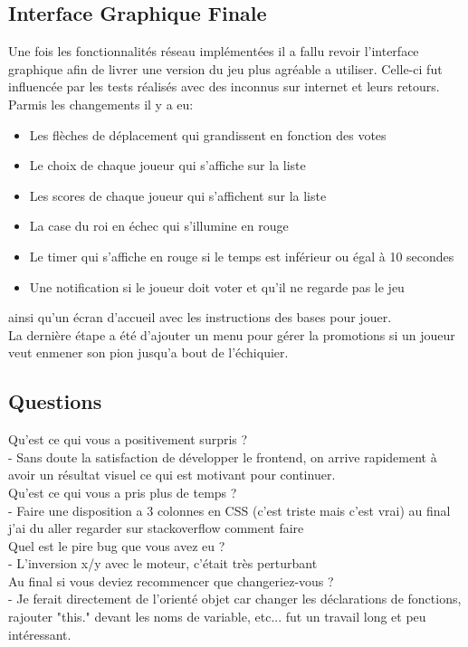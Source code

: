\documentclass{article}
\begin{document}
\subsection{Interface Graphique Finale}
Une fois les fonctionnalités réseau implémentées il a fallu revoir l'interface graphique afin de livrer une version du jeu plus agréable a utiliser. Celle-ci fut influencée par les tests réalisés avec des inconnus sur internet et leurs retours.\\
Parmis les changements il y a eu:
\begin{itemize}
 \item Les flèches de déplacement qui grandissent en fonction des votes
 \item Le choix de chaque joueur qui s'affiche sur la liste
 \item Les scores de chaque joueur qui s'affichent sur la liste
 \item La case du roi en échec qui s'illumine en rouge
 \item Le timer qui s'affiche en rouge si le temps est inférieur ou égal à 10 secondes
 \item Une notification si le joueur doit voter et qu'il ne regarde pas le jeu
\end{itemize}
ainsi qu'un écran d'accueil avec les instructions des bases pour jouer.\\
La dernière étape a été d'ajouter un menu pour gérer la promotions si un joueur veut enmener son pion jusqu'a bout de l'échiquier.
\subsection{Questions}
Qu’est ce qui vous a positivement surpris ?\\
 - Sans doute la satisfaction de développer le frontend, on arrive rapidement à avoir un résultat visuel ce qui est motivant pour continuer.\\
Qu’est ce qui vous a pris plus de temps ?\\
 - Faire une disposition a 3 colonnes en CSS (c'est triste mais c'est vrai) au final j'ai du aller regarder sur stackoverflow comment faire\\
Quel est le pire bug que vous avez eu ?\\
 - L'inversion x/y avec le moteur, c'était très perturbant\\
Au final si vous deviez recommencer que changeriez-vous ?\\
 - Je ferait directement de l'orienté objet car changer les déclarations de fonctions, rajouter "this." devant les noms de variable, etc... fut un travail long et peu intéressant.
\end{document}
